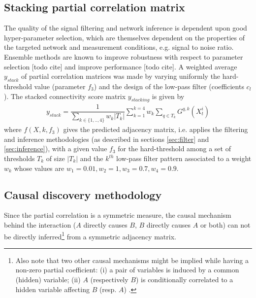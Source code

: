 \documentclass[wcp]{jmlr}
\begin{document}
\subsection{Stacking partial correlation matrix}
\label{sec:stacking}

The quality of the signal filtering and network inference is dependent upon
good hyper-parameter selection, which are themselves dependent on the properties
of the targeted network and measurement conditions, e.g. signal to noise ratio.
Ensemble methods are known to improve robustness with respect to parameter
selection [todo cite] and improve performance [todo cite].
A weighted average $y_{stack}$ of partial correlation matrices was made
by varying uniformly the hard-threshold value (parameter $f_3$) and the design
of the low-pass filter (coefficients $c_l$). The stacked connectivity score
matrix $y_{stacking}$ is given by
\begin{align}
y_{stack} =  \dfrac{1}{\sum_{k\in\{1,..,4\}} w_k |T_k|} \sum_{k=1}^{k=4}  w_k \sum_{q \in T_k} G^{q,k}(X_t^i)
\end{align}
where $f(X, k, f_3)$ gives the predicted adjacency matrix, i.e. applies the
filtering and inference methodologies (as described
in sections \ref{sec:filter} and \ref{sec:inference}), with a  given value
$f_3$ for the hard-threshold among a set of thresholds $T_k$ of size $|T_k|$
and the $k^{th}$ low-pass filter pattern associated to a weight $w_k$ whose
values are $w_1 = 0.01 , w_2 =1, w_3 = 0.7, w_4 = 0.9$.

\subsection{Causal discovery methodology}
Since the partial correlation is a symmetric measure, the causal mechanism behind the
interaction ($A$ directly causes $B$, $B$ directly causes $A$ or both) can not
be directly inferred\footnote{Also note that two other causal mechanisms might be
implied while having a non-zero partial coefficient: (i) a pair of variables
is induced by a common (hidden) variable; (ii) $A$ (respectively $B$) is
conditionally correlated to a hidden variable affecting $B$ (resp. $A$)
\cite{de2004discovery}.} from a symmetric adjacency matrix.
\end{document}
